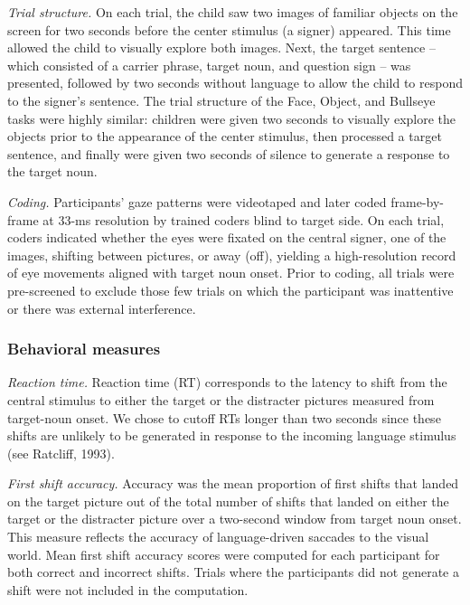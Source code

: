 \documentclass[10pt, letterpaper]{article}
\begin{document}
\emph{Trial structure.} On each trial, the child saw two images of
familiar objects on the screen for two seconds before the center
stimulus (a signer) appeared. This time allowed the child to visually
explore both images. Next, the target sentence -- which consisted of a
carrier phrase, target noun, and question sign -- was presented,
followed by two seconds without language to allow the child to respond
to the signer's sentence. The trial structure of the Face, Object, and
Bullseye tasks were highly similar: children were given two seconds to
visually explore the objects prior to the appearance of the center
stimulus, then processed a target sentence, and finally were given two
seconds of silence to generate a response to the target noun.

\emph{Coding.} Participants' gaze patterns were videotaped and later
coded frame-by-frame at 33-ms resolution by trained coders blind to
target side. On each trial, coders indicated whether the eyes were
fixated on the central signer, one of the images, shifting between
pictures, or away (off), yielding a high-resolution record of eye
movements aligned with target noun onset. Prior to coding, all trials
were pre-screened to exclude those few trials on which the participant
was inattentive or there was external interference.

\subsubsection{Behavioral measures}\label{behavioral-measures}

\emph{Reaction time.} Reaction time (RT) corresponds to the latency to
shift from the central stimulus to either the target or the distracter
pictures measured from target-noun onset. We chose to cutoff RTs longer
than two seconds since these shifts are unlikely to be generated in
response to the incoming language stimulus (see Ratcliff, 1993).

\emph{First shift accuracy.} Accuracy was the mean proportion of first
shifts that landed on the target picture out of the total number of
shifts that landed on either the target or the distracter picture over a
two-second window from target noun onset. This measure reflects the
accuracy of language-driven saccades to the visual world. Mean first
shift accuracy scores were computed for each participant for both
correct and incorrect shifts. Trials where the participants did not
generate a shift were not included in the computation.
\end{document}

